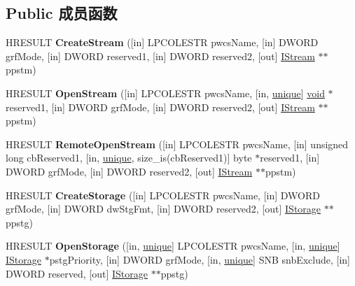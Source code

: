 \subsection*{Public 成员函数}
\begin{DoxyCompactItemize}
\item 
\mbox{\label{interface_i_storage_ad9bb925fa7b2dc9a3fdc8663e49f359a}} 
H\+R\+E\+S\+U\+LT {\bfseries Create\+Stream} (\mbox{[}in\mbox{]} L\+P\+C\+O\+L\+E\+S\+TR pwcs\+Name, \mbox{[}in\mbox{]} D\+W\+O\+RD grf\+Mode, \mbox{[}in\mbox{]} D\+W\+O\+RD reserved1, \mbox{[}in\mbox{]} D\+W\+O\+RD reserved2, \mbox{[}out\mbox{]} \hyperlink{interface_i_stream}{I\+Stream} $\ast$$\ast$ppstm)
\item 
\mbox{\label{interface_i_storage_a520f663b5ee45bf8d9ad71e3fe11ab95}} 
H\+R\+E\+S\+U\+LT {\bfseries Open\+Stream} (\mbox{[}in\mbox{]} L\+P\+C\+O\+L\+E\+S\+TR pwcs\+Name, \mbox{[}in, \hyperlink{interfaceunique}{unique}\mbox{]} \hyperlink{interfacevoid}{void} $\ast$reserved1, \mbox{[}in\mbox{]} D\+W\+O\+RD grf\+Mode, \mbox{[}in\mbox{]} D\+W\+O\+RD reserved2, \mbox{[}out\mbox{]} \hyperlink{interface_i_stream}{I\+Stream} $\ast$$\ast$ppstm)
\item 
\mbox{\label{interface_i_storage_af5b6c23fe4e46d2fd6219de66b290dc3}} 
H\+R\+E\+S\+U\+LT {\bfseries Remote\+Open\+Stream} (\mbox{[}in\mbox{]} L\+P\+C\+O\+L\+E\+S\+TR pwcs\+Name, \mbox{[}in\mbox{]} unsigned long cb\+Reserved1, \mbox{[}in, \hyperlink{interfaceunique}{unique}, size\+\_\+is(cb\+Reserved1)\mbox{]} byte $\ast$reserved1, \mbox{[}in\mbox{]} D\+W\+O\+RD grf\+Mode, \mbox{[}in\mbox{]} D\+W\+O\+RD reserved2, \mbox{[}out\mbox{]} \hyperlink{interface_i_stream}{I\+Stream} $\ast$$\ast$ppstm)
\item 
\mbox{\label{interface_i_storage_a6beac3ecd8551efcb5deaeeb89bebbe9}} 
H\+R\+E\+S\+U\+LT {\bfseries Create\+Storage} (\mbox{[}in\mbox{]} L\+P\+C\+O\+L\+E\+S\+TR pwcs\+Name, \mbox{[}in\mbox{]} D\+W\+O\+RD grf\+Mode, \mbox{[}in\mbox{]} D\+W\+O\+RD dw\+Stg\+Fmt, \mbox{[}in\mbox{]} D\+W\+O\+RD reserved2, \mbox{[}out\mbox{]} \hyperlink{interface_i_storage}{I\+Storage} $\ast$$\ast$ppstg)
\item 
\mbox{\label{interface_i_storage_a7caa761eb4e8bb1919b7a96f63389e3d}} 
H\+R\+E\+S\+U\+LT {\bfseries Open\+Storage} (\mbox{[}in, \hyperlink{interfaceunique}{unique}\mbox{]} L\+P\+C\+O\+L\+E\+S\+TR pwcs\+Name, \mbox{[}in, \hyperlink{interfaceunique}{unique}\mbox{]} \hyperlink{interface_i_storage}{I\+Storage} $\ast$pstg\+Priority, \mbox{[}in\mbox{]} D\+W\+O\+RD grf\+Mode, \mbox{[}in, \hyperlink{interfaceunique}{unique}\mbox{]} S\+NB snb\+Exclude, \mbox{[}in\mbox{]} D\+W\+O\+RD reserved, \mbox{[}out\mbox{]} \hyperlink{interface_i_storage}{I\+Storage} $\ast$$\ast$ppstg)
$$
\end{DoxyCompactItemize}
